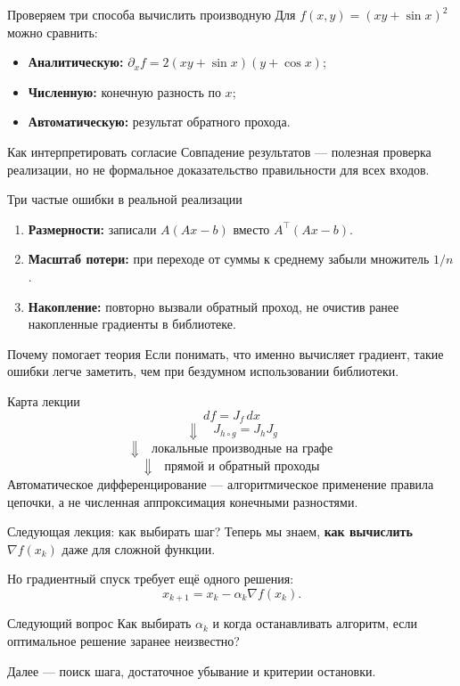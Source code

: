 \documentclass[aspectratio=169,10pt]{beamer}
\newcommand{\grad}{\nabla}
\begin{document}
\begin{frame}{Проверяем три способа вычислить производную}
\small
Для $f(x,y)=(xy+\sin x)^2$ можно сравнить:
\begin{itemize}
\item \textbf{Аналитическую:} $\partial_xf=2(xy+\sin x)(y+\cos x)$;
\item \textbf{Численную:} конечную разность по $x$;
\item \textbf{Автоматическую:} результат обратного прохода.
\end{itemize}
\begin{alertblock}{Как интерпретировать согласие}
Совпадение результатов — полезная проверка реализации, но не формальное доказательство правильности для всех входов.
\end{alertblock}
\end{frame}

\begin{frame}{Три частые ошибки в реальной реализации}
\small
\begin{enumerate}
\item \textbf{Размерности:} записали $A(Ax-b)$ вместо $A^\top(Ax-b)$.
\item \textbf{Масштаб потери:} при переходе от суммы к среднему забыли множитель $1/n$.
\item \textbf{Накопление:} повторно вызвали обратный проход, не очистив ранее накопленные градиенты в библиотеке.
\end{enumerate}
\begin{exampleblock}{Почему помогает теория}
Если понимать, что именно вычисляет градиент, такие ошибки легче заметить, чем при бездумном использовании библиотеки.
\end{exampleblock}
\end{frame}

\begin{frame}{Карта лекции}
\small
\[
\boxed{df=J_f\,dx}
\]
\[
\Downarrow\quad
\boxed{J_{h\circ g}=J_hJ_g}
\]
\[
\Downarrow\quad
\boxed{\text{локальные производные на графе}}
\]
\[
\Downarrow\quad
\boxed{\text{прямой и обратный проходы}}
\]
Автоматическое дифференцирование — алгоритмическое применение правила цепочки, а не численная аппроксимация конечными разностями.
\end{frame}

\begin{frame}{Следующая лекция: как выбирать шаг?}
\small
Теперь мы знаем, \textbf{как вычислить} $\grad f(x_k)$ даже для сложной функции.

Но градиентный спуск требует ещё одного решения:
\[
\boxed{x_{k+1}=x_k-\alpha_k\grad f(x_k).}
\]
\begin{alertblock}{Следующий вопрос}
Как выбирать $\alpha_k$ и когда останавливать алгоритм, если оптимальное решение заранее неизвестно?
\end{alertblock}
Далее — поиск шага, достаточное убывание и критерии остановки.
\end{frame}
\end{document}
